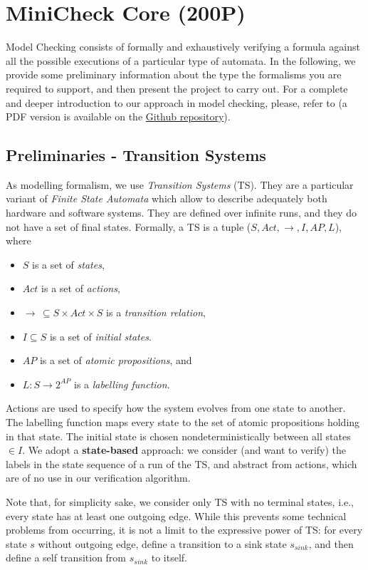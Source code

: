 \documentclass{article}
\begin{document}
\section{MiniCheck Core (200P)}

Model Checking consists of formally and exhaustively verifying a formula 
against all the possible executions of a particular type of automata. 
In the following, we provide some preliminary information 
about the type the formalisms you are required to support, 
and then present the project to carry out. 
For a complete and deeper introduction to our approach in model checking, 
please, refer to \cite{BaKa} (a PDF version is available on the 
\href{https://github.com/francescopont/MiniCheck.git}{Github repository}).


\subsection{Preliminaries - Transition Systems}
\label{subsec-ts}
As modelling formalism, we use \emph{Transition Systems} (TS). They are a particular variant 
of \emph{Finite State Automata} which allow to describe adequately both hardware and software systems. 
They are defined over infinite runs, and they do not have a set of final states. 
Formally, a TS is a tuple ($S, Act, \rightarrow, I, AP, L$), where 
\begin{itemize}
    \item $S$ is a set of \emph{states},
    \item $Act$ is a set of \emph{actions},
    \item $\longrightarrow\,\subseteq S \times Act \times S$ is a \emph{transition relation},
    \item $I \subseteq S$ is a set of \emph{initial states}.
    \item $AP$ is a set of \emph{atomic propositions}, and 
    \item $L : S \rightarrow 2^{AP}$ is a \emph{labelling function}.
\end{itemize}
Actions are used to specify how the system evolves from one state to another. The labelling function 
maps every state to the set of atomic propositions holding in that state. The initial state is chosen 
nondeterministically between all states $\in I$.
We adopt a \textbf{state-based} approach: we consider (and want to verify) the labels in the state sequence 
of a run of the TS, and abstract from actions, which are of no use in our verification algorithm. 

Note that, for simplicity sake, we consider only TS with no terminal states, i.e., every state has at least 
one outgoing edge. While this prevents some technical problems from occurring, it is not a limit to the 
expressive power of TS: for every state $s$ without outgoing edge, define a transition to a sink state 
$s_ {sink}$, and then define a self transition from $s_ {sink}$ to itself.
\end{document}
